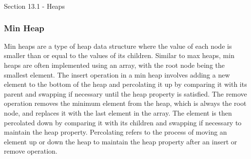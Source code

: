 \begin{notes}{Section 13.1 - Heaps}
    \subsubsection*{Min Heap}
    
    Min heaps are a type of heap data structure where the value of each node is smaller than or equal to the values of its children. Similar to max heaps, min heaps are often implemented using an array, with 
    the root node being the smallest element. The insert operation in a min heap involves adding a new element to the bottom of the heap and percolating it up by comparing it with its parent and swapping if 
    necessary until the heap property is satisfied. The remove operation removes the minimum element from the heap, which is always the root node, and replaces it with the last element in the array. The element 
    is then percolated down by comparing it with its children and swapping if necessary to maintain the heap property. Percolating refers to the process of moving an element up or down the heap to maintain the 
    heap property after an insert or remove operation.
\end{notes}

